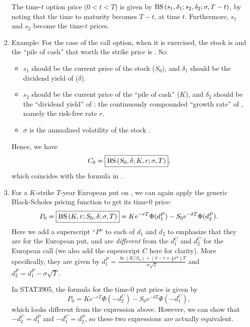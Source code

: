 \begin{enumerate}
\begin{note}
The time-\(t\) option price (\(0<t<T\)) is given by
\(\operatorname{BS}\qty(s_1,\delta_1;s_2,\delta_2;\sigma,T-t)\), by noting that the time to
maturity becomes \(T-t\), at time \(t\). Furthermore, \(s_1\) and \(s_2\) become the time-\(t\) prices.
\end{note}

\item Example: For the case of the call option, when it is exercised, the stock
 is  and the ``pile of cash''
 that worth the strike price is . So:
\begin{itemize}
\item \(s_1\) should be the current price of the stock 
(\(S_0\)), and \(\delta_1\) should be the dividend yield of 
(\(\delta\)).
\item \(s_2\) should be the current price of the ``pile of cash''
 (\(K\)), and \(\delta_2\) should be the ``dividend
yield'' of : the continuously compounded ``growth
rate'' of , namely the risk-free rate \(r\).
\item \(\sigma\) is the annualized volatility of the stock .
\end{itemize}
Hence, we have
\[
C_0=\boxed{\operatorname{BS}\qty(S_0,\delta;K,r;\sigma,T)},
\]
which coincides with the formula in .

\item For a \(K\)-strike \(T\)-year European put on , we can
again apply the generic Black-Scholes pricing function to get its time-0 price:
\[
P_0=\boxed{\operatorname{BS}\qty(K,r;S_0,\delta;\sigma,T)}
=Ke^{-rT}\Phi(d_1^{P})-S_0e^{-\delta T}\Phi(d_2^{P}).
\]
Here we add a superscript ``\(P\)'' to each of \(d_1\) and \(d_2\) to emphasize
that they are for the European put, and are \emph{different} from the \(d_1^C\)
and \(d_2^C\) for the European call \warn{} (we also add the superscript \(C\)
here for clarity). More specifically, they are given by
\(\displaystyle
d_1^{P}=\frac{\ln(K/S_0)+(\delta-r+\frac{1}{2}\sigma^2)T}{\sigma\sqrt{T}}\) and
\(d_2^{P}=d_1^{P}-\sigma\sqrt{T}\).

In STAT3905, the formula for the time-0 put price is given by
\[
P_0=Ke^{-rT}\Phi(-d_2^{C})-S_0e^{-\delta T}\Phi(-d_1^{C}),
\]
which looks different from the expression above. However, we can show that
\(-d_2^C=d_1^P\) and \(-d_1^C=d_2^P\), so these two expressions are actually
equivalent.


\end{enumerate}
